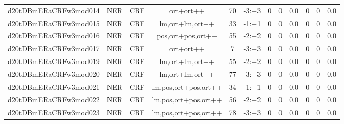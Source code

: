 \documentclass[a4paper]{article}
\begin{document}
\begin{landscape}
\begin{center}
\begin{tabular}{ |c|c|c|c|c|c|c|c|c|c|c|c|}
 
 	
 	\small{ d20tDBmERaCRFw3mod014 } & \small{ NER} & \small{  CRF }  & ort+ort++  &  70 &  \small{  -3:+3 }  &  0 & 0 & 0.0  &  0 & 0 & 0.0 \\
 	

 
 	
 	\small{ d20tDBmERaCRFw3mod015 } & \small{ NER} & \small{  CRF }  & lm,ort+lm,ort++  &  33 &  \small{  -1:+1 }  &  0 & 0 & 0.0  &  0 & 0 & 0.0 \\
 	

 
 	
 	\small{ d20tDBmERaCRFw3mod016 } & \small{ NER} & \small{  CRF }  & pos,ort+pos,ort++  &  55 &  \small{  -2:+2 }  &  0 & 0 & 0.0  &  0 & 0 & 0.0 \\
 	

 
 	
 	\small{ d20tDBmERaCRFw3mod017 } & \small{ NER} & \small{  CRF }  & ort+ort++  &  7 &  \small{  -3:+3 }  &  0 & 0 & 0.0  &  0 & 0 & 0.0 \\
 	

 
 	
 	\small{ d20tDBmERaCRFw3mod019 } & \small{ NER} & \small{  CRF }  & lm,ort+lm,ort++  &  55 &  \small{  -2:+2 }  &  0 & 0 & 0.0  &  0 & 0 & 0.0 \\
 	

 
 	
 	\small{ d20tDBmERaCRFw3mod020 } & \small{ NER} & \small{  CRF }  & lm,ort+lm,ort++  &  77 &  \small{  -3:+3 }  &  0 & 0 & 0.0  &  0 & 0 & 0.0 \\
 	

 
 	
 	\small{ d20tDBmERaCRFw3mod021 } & \small{ NER} & \small{  CRF }  & lm,pos,ort+pos,ort++  &  34 &  \small{  -1:+1 }  &  0 & 0 & 0.0  &  0 & 0 & 0.0 \\
 	

 
 	
 	\small{ d20tDBmERaCRFw3mod022 } & \small{ NER} & \small{  CRF }  & lm,pos,ort+pos,ort++  &  56 &  \small{  -2:+2 }  &  0 & 0 & 0.0  &  0 & 0 & 0.0 \\
 	

 
 	
 	\small{ d20tDBmERaCRFw3mod023 } & \small{ NER} & \small{  CRF }  & lm,pos,ort+pos,ort++  &  78 &  \small{  -3:+3 }  &  0 & 0 & 0.0  &  0 & 0 & 0.0 \\
 	
 \hline
\end{tabular}
\end{center}





\end{landscape}
\end{document}
